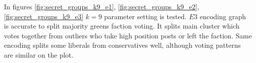 \documentclass[a4paper,12pt]{article}
\begin{document}
	\clearpage
	
	In figures \ref{fig:secret_groups_k9_e1},  \ref{fig:secret_groups_k9_e2}, \ref{fig:secret_groups_k9_e3} $k=9$ parameter setting is tested. $E3$ encoding graph is accurate to split majority greens faction voting. It splits main cluster which votes together from outliers who take high position posts or left the faction. Same encoding splits some liberals from conservatives well, although voting patterns are similar on the plot.
	
	\begin{figure}[!tbp]
		\centering
		\hfill
		\hfill

\end{figure}
\end{document}
